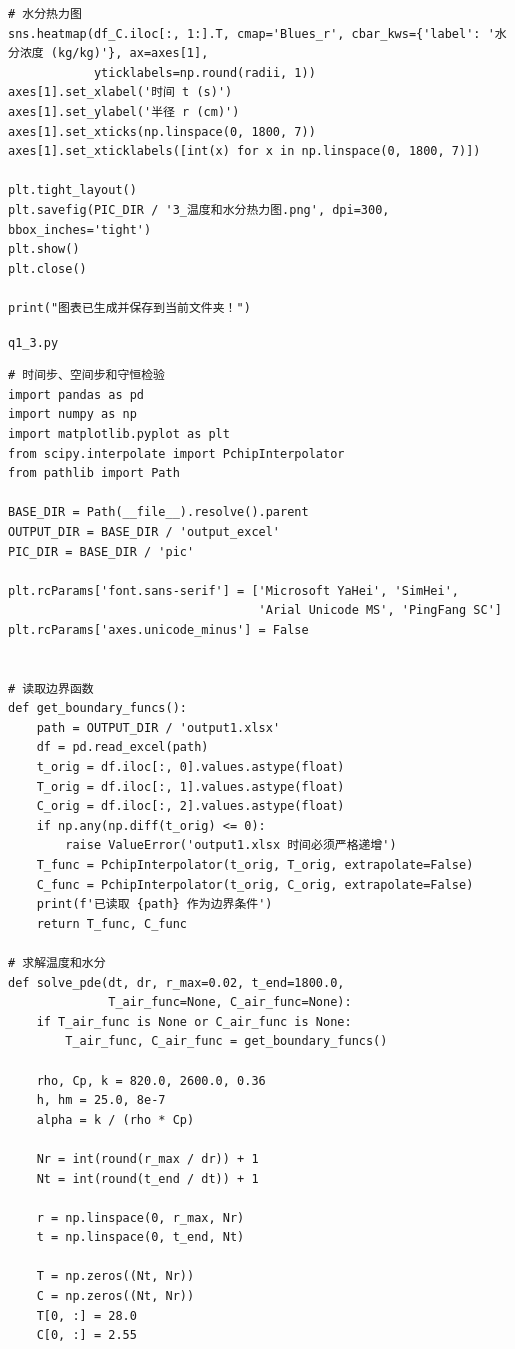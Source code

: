 \documentclass[withoutpreface,bwprint]{cumcm_thesis}
\begin{document}
\begin{appendices}
\begin{lstlisting}
# 水分热力图
sns.heatmap(df_C.iloc[:, 1:].T, cmap='Blues_r', cbar_kws={'label': '水分浓度 (kg/kg)'}, ax=axes[1],
            yticklabels=np.round(radii, 1))
axes[1].set_xlabel('时间 t (s)')
axes[1].set_ylabel('半径 r (cm)')
axes[1].set_xticks(np.linspace(0, 1800, 7))
axes[1].set_xticklabels([int(x) for x in np.linspace(0, 1800, 7)])

plt.tight_layout()
plt.savefig(PIC_DIR / '3_温度和水分热力图.png', dpi=300, bbox_inches='tight')
plt.show()
plt.close()

print("图表已生成并保存到当前文件夹！")

\end{lstlisting}


\noindent\texttt{q1\_3.py}
\begin{lstlisting}
# 时间步、空间步和守恒检验
import pandas as pd
import numpy as np
import matplotlib.pyplot as plt
from scipy.interpolate import PchipInterpolator
from pathlib import Path

BASE_DIR = Path(__file__).resolve().parent
OUTPUT_DIR = BASE_DIR / 'output_excel'
PIC_DIR = BASE_DIR / 'pic'

plt.rcParams['font.sans-serif'] = ['Microsoft YaHei', 'SimHei',
                                   'Arial Unicode MS', 'PingFang SC']
plt.rcParams['axes.unicode_minus'] = False


# 读取边界函数
def get_boundary_funcs():
    path = OUTPUT_DIR / 'output1.xlsx'
    df = pd.read_excel(path)
    t_orig = df.iloc[:, 0].values.astype(float)
    T_orig = df.iloc[:, 1].values.astype(float)
    C_orig = df.iloc[:, 2].values.astype(float)
    if np.any(np.diff(t_orig) <= 0):
        raise ValueError('output1.xlsx 时间必须严格递增')
    T_func = PchipInterpolator(t_orig, T_orig, extrapolate=False)
    C_func = PchipInterpolator(t_orig, C_orig, extrapolate=False)
    print(f'已读取 {path} 作为边界条件')
    return T_func, C_func

# 求解温度和水分
def solve_pde(dt, dr, r_max=0.02, t_end=1800.0,
              T_air_func=None, C_air_func=None):
    if T_air_func is None or C_air_func is None:
        T_air_func, C_air_func = get_boundary_funcs()

    rho, Cp, k = 820.0, 2600.0, 0.36
    h, hm = 25.0, 8e-7
    alpha = k / (rho * Cp)

    Nr = int(round(r_max / dr)) + 1
    Nt = int(round(t_end / dt)) + 1

    r = np.linspace(0, r_max, Nr)
    t = np.linspace(0, t_end, Nt)

    T = np.zeros((Nt, Nr))
    C = np.zeros((Nt, Nr))
    T[0, :] = 28.0
    C[0, :] = 2.55


\end{lstlisting}
\end{appendices}
\end{document}
